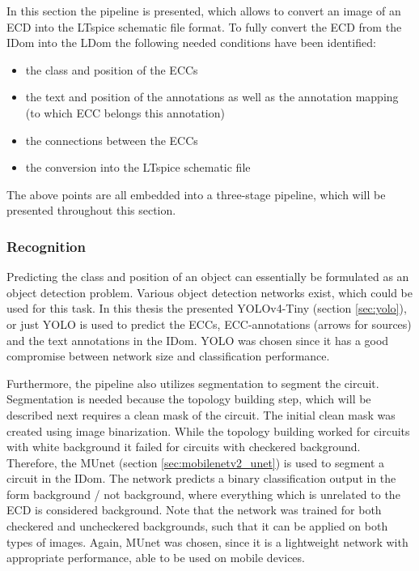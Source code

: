 \label{sec:pipeline}

In this section the pipeline is presented, which allows to convert an image of an \ac{ECD} into the LTspice schematic file format.
To fully convert the \ac{ECD} from the \ac{IDom} into the \ac{LDom} the following needed conditions have been identified:

\begin{itemize}
    \item the class and position of the \acp{ECC}
    \item the text and position of the annotations as well as the annotation mapping (to which \ac{ECC} belongs this annotation)
    \item the connections between the \acp{ECC}
    \item the conversion into the LTspice schematic file
\end{itemize}

The above points are all embedded into a three-stage pipeline, which will be presented throughout this section.

\subsubsection{Recognition}

Predicting the class and position of an object can essentially be formulated as an object detection problem.
Various object detection networks exist, which could be used for this task.
In this thesis the presented \ac{YOLOv4}-Tiny (section \ref{sec:yolo}), or just \ac{YOLO} is used to predict the \acp{ECC}, \ac{ECC}-annotations (arrows for sources) and the text annotations in the \ac{IDom}.
\ac{YOLO} was chosen since it has a good compromise between network size and classification performance.

Furthermore, the pipeline also utilizes segmentation to segment the circuit.
Segmentation is needed because the topology building step, which will be described next requires a clean mask of the circuit.
The initial clean mask was created using image binarization.
While the topology building worked for circuits with white background it failed for circuits with checkered background.
Therefore, the \ac{MUnet} (section \ref{sec:mobilenetv2_unet}) is used to segment a circuit in the \ac{IDom}.
The network predicts a binary classification output in the form background / not background, where everything which is unrelated to the \ac{ECD} is considered background.
Note that the network was trained for both checkered and uncheckered backgrounds, such that it can be applied on both types of images.
Again, \ac{MUnet} was chosen, since it is a lightweight network with appropriate performance, able to be used on mobile devices.

